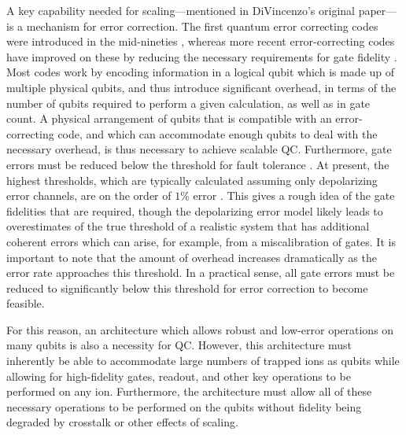 \documentclass[%
reprint,
 amsmath,amssymb,
]{revtex4-1}
\begin{document}
A key capability needed for scaling---mentioned in DiVincenzo's original paper---is a mechanism for error correction. The first quantum error correcting codes were introduced in the mid-nineties \cite{PhysRevA.52.R2493,CalderbankErrorCorrection1996,SteaneErrorCorrection1996}, whereas more recent error-correcting codes have improved on these by reducing the necessary requirements for gate fidelity \cite{RaussendorfSurfaceCode2007}. Most codes work by encoding information in a logical qubit which is made up of multiple physical qubits, and thus introduce significant overhead, in terms of the number of qubits required to perform a given calculation, as well as in gate count. A physical arrangement of qubits that is compatible with an error-correcting code, and which can accommodate enough qubits to deal with the necessary overhead, is thus necessary to achieve scalable QC. Furthermore, gate errors must be reduced below the threshold for fault tolerance \cite{GottesmanFTQC1998}. At present, the highest thresholds, which are typically calculated assuming only depolarizing error channels, are on the order of $1 \%$ error \cite{RaussendorfSurfaceCode2007}.  This gives a rough idea of the gate fidelities that are required, though the depolarizing error model likely leads to overestimates of the true threshold of a realistic system that has additional coherent errors which can arise, for example, from a miscalibration of gates. It is important to note that the amount of overhead increases dramatically as the error rate approaches this threshold. In a practical sense, all gate errors must be reduced to significantly below this threshold for error correction to become feasible.

For this reason, an architecture which allows robust and low-error operations on many qubits is also a necessity for QC. However, this architecture must inherently be able to accommodate large numbers of trapped ions as qubits while allowing for high-fidelity gates, readout, and other key operations to be performed on any ion. Furthermore, the architecture must allow all of these necessary operations to be performed on the qubits without fidelity being degraded by crosstalk or other effects of scaling.
\end{document}
